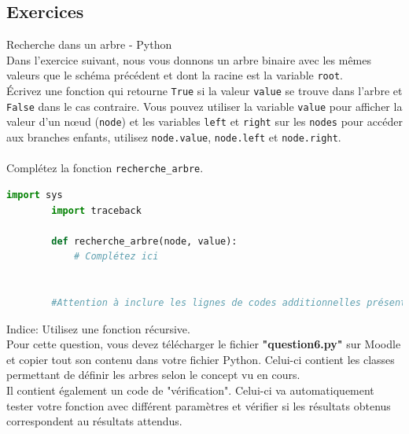     \subsection{Exercices}
    
    \begin{Exercice}[15 minutes] Recherche dans un arbre - Python\\
        
        Dans l'exercice suivant, nous vous donnons un arbre binaire avec les mêmes valeurs que le schéma précédent et dont la racine est la variable \lstinline{root}.\\
    
        Écrivez une fonction qui retourne \lstinline{True} si la valeur \lstinline{value} se trouve dans l'arbre et \lstinline{False} dans le cas contraire. Vous pouvez utiliser la variable \lstinline{value} pour afficher la valeur d'un nœud (\lstinline{node}) et les variables \lstinline{left} et \lstinline{right} sur les \lstinline{nodes} pour accéder aux branches enfants, utilisez \lstinline{node.value}, \lstinline{node.left} et \lstinline{node.right}.\\\\
        Complétez la fonction \lstinline{recherche_arbre}.\\
        \begin{lstlisting}[language=Python]
        import sys
        import traceback
    
        def recherche_arbre(node, value):
            # Complétez ici
            
            
        #Attention à inclure les lignes de codes additionnelles présentes dans le fichier "question6.py" sur Moodle
        \end{lstlisting}
    
        \begin{conseil}
        Indice: Utilisez une fonction récursive.\\
        
        Pour cette question, vous devez télécharger le fichier \textbf{"question6.py"} sur Moodle et copier tout son contenu dans votre fichier Python. Celui-ci contient les classes permettant de définir les arbres selon le concept vu en cours. \\
        
        Il contient également un code de "vérification". Celui-ci va automatiquement tester votre fonction avec différent paramètres et vérifier si les résultats obtenus correspondent au résultats attendus.
        \end{conseil}
    
        \begin{solution}
            
        \end{solution}

    
    \end{Exercice}
    
    
